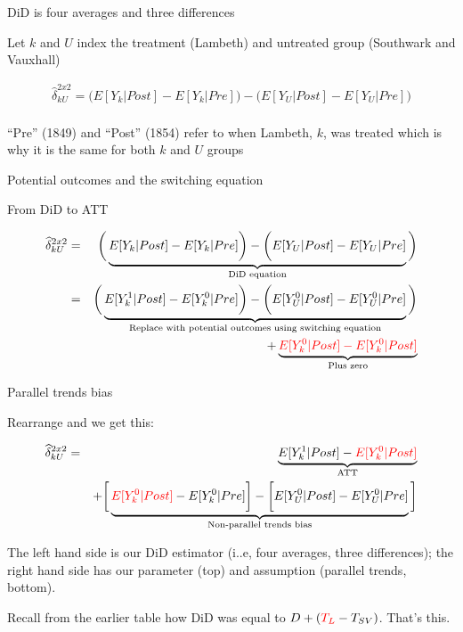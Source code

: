 \documentclass{beamer}
\begin{document}
\begin{frame}{DiD is four averages and three differences}

Let $k$ and $U$ index the treatment (Lambeth) and untreated group (Southwark and Vauxhall)

\begin{eqnarray*}
\widehat{\delta}^{2x2}_{kU} = \bigg ( E[Y_k|Post] - E[Y_k|Pre] \bigg ) - \bigg ( E[Y_U | Post ] - E[ Y_U | Pre] \bigg) \\
\end{eqnarray*}

\bigskip

``Pre'' (1849) and ``Post'' (1854) refer to when Lambeth, $k$, was treated which is why it is the same for both $k$ and $U$ groups


\end{frame}



\begin{frame}{Potential outcomes and the switching equation}

From DiD to ATT

\begin{eqnarray*}
\widehat{\delta}^{2x2}_{kU} &=&  \bigg ( \underbrace{E[Y_k|Post] - E[Y_k|Pre] \bigg ) - \bigg ( E[Y_U | Post ] - E[ Y_U | Pre]}_{\mathclap{\text{DiD equation}}} \bigg)  \\
&=& \bigg ( \underbrace{E[Y^1_k|Post] - E[Y^0_k|Pre] \bigg ) - \bigg ( E[Y^0_U | Post ] - E[ Y^0_U | Pre]}_{\mathclap{\text{Replace with potential outcomes using switching equation}}} \bigg)  \\
&&+ \underbrace{\textcolor{red}{E[Y_k^0 |Post] - E[Y^0_k | Post]}}_{\mathclap{\text{Plus zero}}} 
\end{eqnarray*}

\end{frame}

\begin{frame}{Parallel trends bias}

Rearrange and we get this:

\begin{eqnarray*}
\widehat{\delta}^{2x2}_{kU} &=& \underbrace{E[Y^1_k | Post] - \textcolor{red}{E[Y^0_k | Post]}}_{\mathclap{\text{ATT}}} \\
&& + \bigg [  \underbrace{\textcolor{red}{E[Y^0_k | Post]} - E[Y^0_k | Pre] \bigg ] - \bigg [ E[Y^0_U | Post] - E[Y_U^0 | Pre] }_{\mathclap{\text{Non-parallel trends bias}}} \bigg ]
\end{eqnarray*}

\bigskip

The left hand side is our DiD estimator (i..e, four averages, three differences); the right hand side has our parameter (top) and assumption (parallel trends, bottom).  

\bigskip

Recall from the earlier table how DiD was equal to $D+(\textcolor{red}{T_L} - T_{SV})$.  That's this.



\end{frame}
\end{document}
